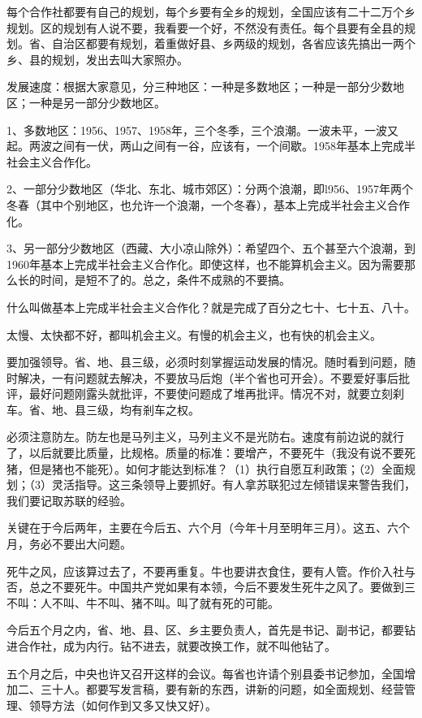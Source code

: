 每个合作社都要有自己的规划，每个乡要有全乡的规划，全国应该有二十二万个乡规划。区的规划有人说不要，我看要一个好，不然没有责任。每个县要有全县的规划。省、自治区都要有规划，着重做好县、乡两级的规划，各省应该先搞出一两个乡、县的规划，发出去叫大家照办。

发展速度：根据大家意见，分三种地区：一种是多数地区；一种是一部分少数地区；一种是另一部分少数地区。

1、多数地区：1956、1957、1958年，三个冬季，三个浪潮。一波未平，一波又起。两波之间有一伏，两山之间有一谷，应该有，一个间歇。1958年基本上完成半社会主义合作化。

2、一部分少数地区（华北、东北、城市郊区）：分两个浪潮，即l956、1957年两个冬春（其中个别地区，也允许一个浪潮，一个冬春），基本上完成半社会主义合作化。

3、另一部分少数地区（西藏、大小凉山除外）：希望四个、五个甚至六个浪潮，到1960年基本上完成半社会主义合作化。即使这样，也不能算机会主义。因为需要那么长的时间，是短不了的。总之，条件不成熟的不要搞。

什么叫做基本上完成半社会主义合作化？就是完成了百分之七十、七十五、八十。

太慢、太快都不好，都叫机会主义。有慢的机会主义，也有快的机会主义。

要加强领导。省、地、县三级，必须时刻掌握运动发展的情况。随时看到问题，随时解决，一有问题就去解决，不要放马后炮（半个省也可开会）。不要爱好事后批评，最好问题刚露头就批评，不要使问题成了堆再批评。情况不对，就要立刻刹车。省、地、县三级，均有剎车之权。

必须注意防左。防左也是马列主义，马列主义不是光防右。速度有前边说的就行了，以后就要比质量，比规格。质量的标准：要增产，不要死牛（我没有说不要死猪，但是猪也不能死）。如何才能达到标准？（1）执行自愿互利政策；（2）全面规划；（3）灵活指导。这三条领导上要抓好。有人拿苏联犯过左倾错误来警告我们，我们要记取苏联的经验。

关键在于今后两年，主要在今后五、六个月（今年十月至明年三月）。这五、六个月，务必不要出大问题。

死牛之风，应该算过去了，不要再重复。牛也要讲衣食住，要有人管。作价入社与否，总之不要死牛。中国共产党如果有本领，今后不要发生死牛之风了。要做到三不叫：人不叫、牛不叫、猪不叫。叫了就有死的可能。

今后五个月之内，省、地、县、区、乡主要负责人，首先是书记、副书记，都要钻进合作社，成为内行。钻不进去，就要改换工作，就不叫他钻了。

五个月之后，中央也许又召开这样的会议。每省也许请个别县委书记参加，全国增加二、三十人。都要写发言稿，要有新的东西，讲新的问题，如全面规划、经营管理、领导方法（如何作到又多又快又好）。

